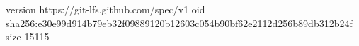 version https://git-lfs.github.com/spec/v1
oid sha256:e30e99d914b79eb32f09889120b12603c054b90bf62e2112d256b89db312b24f
size 15115
